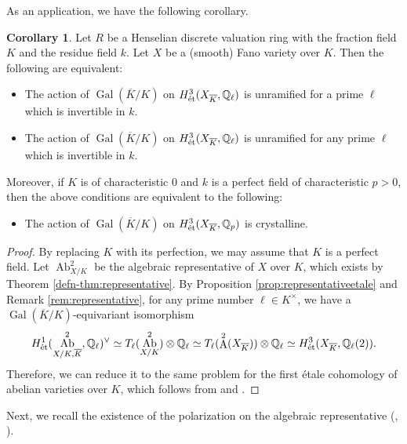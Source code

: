 \documentclass[autodetect-engine, a4paper]{amsart}
\theoremstyle{definition}
\newtheorem{cor}[thm]{Corollary}
\def\Q{{\mathbb Q}}
\DeclareMathOperator\A{\mathrm{A}}
\DeclareMathOperator\Ab{\mathrm{Ab}}
\DeclareMathOperator\Gal{\mathrm{Gal}}
\def\et{\mathop{\text{\rm \'et}}}
\begin{document}
As an application, we have the following corollary.

\begin{cor}
\label{cor:unramlindep}
Let $R$ be a Henselian discrete valuation ring with the fraction field $K$ and the residue field $k$. 
Let $X$ be a (smooth) Fano variety over $K$.
Then the following are equivalent:
\begin{itemize}
\item The action of $\Gal(\overline{K}/K)$ on $H^3_{\et}(X_{\overline{K}}, \Q_{\ell})$
is unramified for a prime $\ell$ which is invertible in $k$.

\item The action of $\Gal(\overline{K}/K)$ on $H^3_{\et}(X_{\overline{K}}, \Q_{\ell})$
is unramified for any prime $\ell$ which is invertible in $k$.
\end{itemize}
Moreover, if $K$ is of characteristic $0$ and $k$ is a perfect field of characteristic $p >0$, then the above conditions are equivalent to the following:
\begin{itemize}
\item The action of $\Gal(\overline{K}/K)$ on $H^3_{\et}(X_{\overline{K}}, \Q_p)$
is crystalline.
\end{itemize}
\end{cor}

\begin{proof}
By replacing $K$ with its perfection, we may assume that $K$ is a perfect field.
Let $\Ab^2_{X/K}$ be the algebraic representative of $X$ over $K$, which exists by Theorem \ref{defn-thm:representative}.
By Proposition \ref{prop:representativeetale} and Remark \ref{rem:representative}, for any prime number $\ell \in K^{\times}$, we have a $\Gal(\overline{K}/K)$-equivariant isomorphism 
\[
H^1_{\et}(\Ab^2_{X/K, \overline{K}}, \Q_{\ell})^{\vee} \simeq T_{\ell} (\Ab^2_{X/K}) \otimes \Q_{\ell}
\simeq T_{\ell} (\A^2(X_{\overline{K}})) \otimes \Q_{\ell} 
\simeq H^3_{\et} (X_{\overline{K}}, \Q_{\ell} (2)).
\]
Therefore, we can reduce it to the same problem for the first \'{e}tale cohomology of abelian varieties over $K$, which follows from \cite[Theorem 1]{Serre-Tate} and \cite[Theorem 1]{Coleman-Iovita}.
\end{proof}

Next, we recall the existence of the polarization on the algebraic representative (\cite{Benoist-Wittenberg1}, \cite{ACMVdecomposition}).
\end{document}
